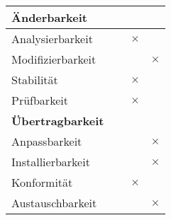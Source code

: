 \begin{table}[H]
\begin{tabularx}{\textwidth}{l|X|X|X|X}
		\toprule
		\multicolumn{5}{l}{\textbf{Änderbarkeit}}                             \\ 
		\midrule
		\quad Analysierbarkeit      &          &          & $\times$ &  \\ \hline
		\quad Modifizierbarkeit     &          &          &          & $\times$       \\ \hline
		\quad Stabilität            &          &          & \centering  $\times$ &  \\ \hline
		\quad Prüfbarkeit           &          &          & \centering $\times$ &  \\ 
		\toprule
		\multicolumn{5}{l}{\textbf{Übertragbarkeit}}                          \\ 
		\midrule
		\quad Anpassbarkeit         &          &          &          & $\times$       \\ \hline
		\quad Installierbarkeit     &          &          &          & $\times$       \\ \hline
		\quad Konformität           &          &          & $\times$ &  \\ \hline
		\quad Austauschbarkeit      &          &          &          & $\times$       \\ \hline
	\end{tabularx}%
	\label{tab:QualAnfor}%
\end{table}%
	
